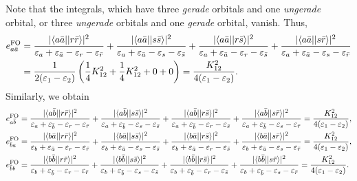 \documentclass[a4paper]{book}
\newcounter{solution}[chapter]
\newcommand{\FO}{{\rm FO}}
\begin{document}
\begin{solution}
	Note that the integrals, which have three {\it gerade} orbitals and one {\it ungerade} orbital, or three {\it ungerade} orbitals and one {\it gerade} orbital, vanish. Thus,
	\begin{align*}
		e^\FO_{a\bar{a}} &= \frac{ | \langle a \bar{a} || r \bar{r} \rangle |^2 }{ \varepsilon_a + \varepsilon_{\bar{a}} - \varepsilon_r - \varepsilon_{\bar{r}} }	+ \frac{ | \langle a \bar{a} || s \bar{s} \rangle |^2 }{ \varepsilon_a + \varepsilon_{\bar{a}} - \varepsilon_s - \varepsilon_{\bar{s}} } + \frac{ | \langle a \bar{a} || r \bar{s} \rangle |^2 }{ \varepsilon_a + \varepsilon_{\bar{a}} - \varepsilon_r - \varepsilon_{\bar{s}} } + \frac{ | \langle a \bar{a} || s \bar{r} \rangle |^2 }{ \varepsilon_a + \varepsilon_{\bar{a}} - \varepsilon_s - \varepsilon_{\bar{r}} } \\
		&= \frac{1}{2(\varepsilon_1 - \varepsilon_2)} \left( \frac{1}{4} K^2_{12} + \frac{1}{4} K^2_{12} + 0 + 0 \right) = \frac{ K^2_{12} }{ 4(\varepsilon_1 - \varepsilon_2) }. 
	\end{align*}
	Similarly, we obtain
	\begin{align*}
		e^\FO_{a\bar{b}} &= \frac{ | \langle a \bar{b} || r \bar{r} \rangle |^2 }{ \varepsilon_a + \varepsilon_{\bar{b}} - \varepsilon_r - \varepsilon_{\bar{r}} }	+ \frac{ | \langle a \bar{b} || s \bar{s} \rangle |^2 }{ \varepsilon_a + \varepsilon_{\bar{b}} - \varepsilon_s - \varepsilon_{\bar{s}} } + \frac{ | \langle a \bar{b} || r \bar{s} \rangle |^2 }{ \varepsilon_a + \varepsilon_{\bar{b}} - \varepsilon_r - \varepsilon_{\bar{s}} } + \frac{ | \langle a \bar{b} || s \bar{r} \rangle |^2 }{ \varepsilon_a + \varepsilon_{\bar{b}} - \varepsilon_s - \varepsilon_{\bar{r}} } = \frac{ K^2_{12} }{ 4(\varepsilon_1 - \varepsilon_2) } , \\
		e^\FO_{\bar{b}a} &= \frac{ | \langle b \bar{a} || r \bar{r} \rangle |^2 }{ \varepsilon_b + \varepsilon_{\bar{a}} - \varepsilon_r - \varepsilon_{\bar{r}} }	+ \frac{ | \langle b \bar{a} || s \bar{s} \rangle |^2 }{ \varepsilon_b + \varepsilon_{\bar{a}} - \varepsilon_s - \varepsilon_{\bar{s}} } + \frac{ | \langle b \bar{a} || r \bar{s} \rangle |^2 }{ \varepsilon_b + \varepsilon_{\bar{a}} - \varepsilon_r - \varepsilon_{\bar{s}} } + \frac{ | \langle b \bar{a} || s \bar{r} \rangle |^2 }{ \varepsilon_b + \varepsilon_{\bar{a}} - \varepsilon_s - \varepsilon_{\bar{r}} } = \frac{ K^2_{12} }{ 4(\varepsilon_1 - \varepsilon_2) } , \\
		e^\FO_{\bar{b}b} &= \frac{ | \langle b \bar{b} || r \bar{r} \rangle |^2 }{ \varepsilon_b + \varepsilon_{\bar{b}} - \varepsilon_r - \varepsilon_{\bar{r}} }	+ \frac{ | \langle b \bar{b} || s \bar{s} \rangle |^2 }{ \varepsilon_b + \varepsilon_{\bar{b}} - \varepsilon_s - \varepsilon_{\bar{s}} } + \frac{ | \langle b \bar{b} || r \bar{s} \rangle |^2 }{ \varepsilon_b + \varepsilon_{\bar{b}} - \varepsilon_r - \varepsilon_{\bar{s}} } + \frac{ | \langle b \bar{b} || s \bar{r} \rangle |^2 }{ \varepsilon_b + \varepsilon_{\bar{b}} - \varepsilon_s - \varepsilon_{\bar{r}} } = \frac{ K^2_{12} }{ 4(\varepsilon_1 - \varepsilon_2) }. 

\end{align*}
\end{solution}
\end{document}
